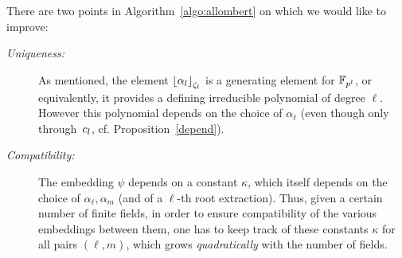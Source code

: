 \documentclass{sig-alternate}
\begin{document}
There are two points in Algorithm~\ref{algo:allombert} on which we would like to improve:
\begin{description}
\item[\emph{Uniqueness:}] As mentioned, the element $\left\lfloor \alpha_{l} \right\rfloor_{\zeta_l}$ is a generating element for $\mathbb{F}_{p^{l}}$,
or equivalently, it provides a defining irreducible polynomial of degree $\ell$.
However this polynomial depends on the choice of $\alpha_{\ell}$
(even though only through~$c_l$, cf. Proposition~\ref{depend}).
\item[\emph{Compatibility:}] The embedding $\psi$ depends on a constant $\kappa$,
which itself depends on the choice of $\alpha_\ell,\alpha_m$ (and of a $\ell$-th root extraction).
Thus, given a certain number of finite fields, in order to ensure compatibility of the various
embeddings between them, one has to keep track of these constants $\kappa$
for all pairs $(\ell,m)$,
which grows \emph{quadratically} with the number of fields.
\end{description}
\end{document}
